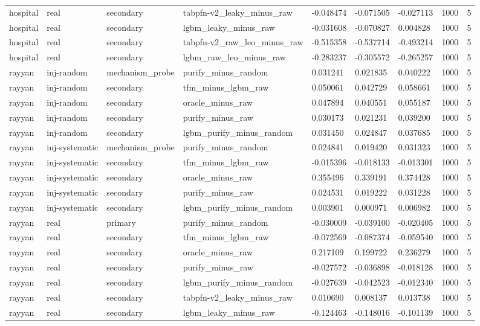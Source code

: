 \begin{tabular}{lllllllll}
hospital & real & secondary & tabpfn-v2\_leaky\_minus\_raw & -0.048474 & -0.071505 & -0.027113 & 1000 & 5 \\
hospital & real & secondary & lgbm\_leaky\_minus\_raw & -0.031608 & -0.070827 & 0.004828 & 1000 & 5 \\
hospital & real & secondary & tabpfn-v2\_raw\_leo\_minus\_raw & -0.515358 & -0.537714 & -0.493214 & 1000 & 5 \\
hospital & real & secondary & lgbm\_raw\_leo\_minus\_raw & -0.283237 & -0.305572 & -0.265257 & 1000 & 5 \\
rayyan & inj-random & mechanism\_probe & purify\_minus\_random & 0.031241 & 0.021835 & 0.040222 & 1000 & 5 \\
rayyan & inj-random & secondary & tfm\_minus\_lgbm\_raw & 0.050061 & 0.042729 & 0.058661 & 1000 & 5 \\
rayyan & inj-random & secondary & oracle\_minus\_raw & 0.047894 & 0.040551 & 0.055187 & 1000 & 5 \\
rayyan & inj-random & secondary & purify\_minus\_raw & 0.030173 & 0.021231 & 0.039200 & 1000 & 5 \\
rayyan & inj-random & secondary & lgbm\_purify\_minus\_random & 0.031450 & 0.024847 & 0.037685 & 1000 & 5 \\
rayyan & inj-systematic & mechanism\_probe & purify\_minus\_random & 0.024841 & 0.019420 & 0.031323 & 1000 & 5 \\
rayyan & inj-systematic & secondary & tfm\_minus\_lgbm\_raw & -0.015396 & -0.018133 & -0.013301 & 1000 & 5 \\
rayyan & inj-systematic & secondary & oracle\_minus\_raw & 0.355496 & 0.339191 & 0.374428 & 1000 & 5 \\
rayyan & inj-systematic & secondary & purify\_minus\_raw & 0.024531 & 0.019222 & 0.031228 & 1000 & 5 \\
rayyan & inj-systematic & secondary & lgbm\_purify\_minus\_random & 0.003901 & 0.000971 & 0.006982 & 1000 & 5 \\
rayyan & real & primary & purify\_minus\_random & -0.030009 & -0.039100 & -0.020405 & 1000 & 5 \\
rayyan & real & secondary & tfm\_minus\_lgbm\_raw & -0.072569 & -0.087374 & -0.059540 & 1000 & 5 \\
rayyan & real & secondary & oracle\_minus\_raw & 0.217109 & 0.199722 & 0.236279 & 1000 & 5 \\
rayyan & real & secondary & purify\_minus\_raw & -0.027572 & -0.036898 & -0.018128 & 1000 & 5 \\
rayyan & real & secondary & lgbm\_purify\_minus\_random & -0.027639 & -0.042523 & -0.012340 & 1000 & 5 \\
rayyan & real & secondary & tabpfn-v2\_leaky\_minus\_raw & 0.010690 & 0.008137 & 0.013738 & 1000 & 5 \\
rayyan & real & secondary & lgbm\_leaky\_minus\_raw & -0.124463 & -0.148016 & -0.101139 & 1000 & 5 \\
\hline
\end{tabular}

